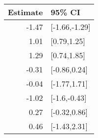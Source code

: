 \begin{tabular}{rl}
  \hline
Estimate & 95\% CI \\ 
  \hline
-1.47 & [-1.66,-1.29] \\ 
  1.01 & [0.79,1.25] \\ 
  1.29 & [0.74,1.85] \\ 
  -0.31 & [-0.86,0.24] \\ 
  -0.04 & [-1.77,1.71] \\ 
  -1.02 & [-1.6,-0.43] \\ 
  0.27 & [-0.32,0.86] \\ 
  0.46 & [-1.43,2.31] \\ 
   \hline
\end{tabular}


